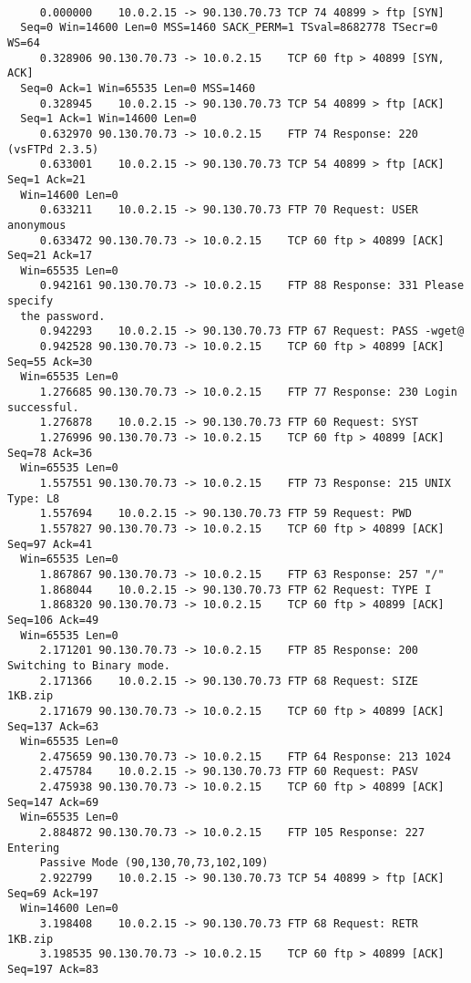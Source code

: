 \documentclass[a4paper]{report} %
\begin{document}
\begin{lstlisting}

     0.000000    10.0.2.15 -> 90.130.70.73 TCP 74 40899 > ftp [SYN] 
  Seq=0 Win=14600 Len=0 MSS=1460 SACK_PERM=1 TSval=8682778 TSecr=0 WS=64
     0.328906 90.130.70.73 -> 10.0.2.15    TCP 60 ftp > 40899 [SYN, ACK] 
  Seq=0 Ack=1 Win=65535 Len=0 MSS=1460
     0.328945    10.0.2.15 -> 90.130.70.73 TCP 54 40899 > ftp [ACK] 
  Seq=1 Ack=1 Win=14600 Len=0
     0.632970 90.130.70.73 -> 10.0.2.15    FTP 74 Response: 220 (vsFTPd 2.3.5)
     0.633001    10.0.2.15 -> 90.130.70.73 TCP 54 40899 > ftp [ACK] Seq=1 Ack=21 
  Win=14600 Len=0
     0.633211    10.0.2.15 -> 90.130.70.73 FTP 70 Request: USER anonymous
     0.633472 90.130.70.73 -> 10.0.2.15    TCP 60 ftp > 40899 [ACK] Seq=21 Ack=17 
  Win=65535 Len=0 
     0.942161 90.130.70.73 -> 10.0.2.15    FTP 88 Response: 331 Please specify 
  the password.
     0.942293    10.0.2.15 -> 90.130.70.73 FTP 67 Request: PASS -wget@
     0.942528 90.130.70.73 -> 10.0.2.15    TCP 60 ftp > 40899 [ACK] Seq=55 Ack=30 
  Win=65535 Len=0
     1.276685 90.130.70.73 -> 10.0.2.15    FTP 77 Response: 230 Login successful.
     1.276878    10.0.2.15 -> 90.130.70.73 FTP 60 Request: SYST
     1.276996 90.130.70.73 -> 10.0.2.15    TCP 60 ftp > 40899 [ACK] Seq=78 Ack=36  
  Win=65535 Len=0
     1.557551 90.130.70.73 -> 10.0.2.15    FTP 73 Response: 215 UNIX Type: L8
     1.557694    10.0.2.15 -> 90.130.70.73 FTP 59 Request: PWD
     1.557827 90.130.70.73 -> 10.0.2.15    TCP 60 ftp > 40899 [ACK] Seq=97 Ack=41 
  Win=65535 Len=0
     1.867867 90.130.70.73 -> 10.0.2.15    FTP 63 Response: 257 "/"
     1.868044    10.0.2.15 -> 90.130.70.73 FTP 62 Request: TYPE I
     1.868320 90.130.70.73 -> 10.0.2.15    TCP 60 ftp > 40899 [ACK] Seq=106 Ack=49 
  Win=65535 Len=0
     2.171201 90.130.70.73 -> 10.0.2.15    FTP 85 Response: 200 Switching to Binary mode.
     2.171366    10.0.2.15 -> 90.130.70.73 FTP 68 Request: SIZE 1KB.zip
     2.171679 90.130.70.73 -> 10.0.2.15    TCP 60 ftp > 40899 [ACK] Seq=137 Ack=63 
  Win=65535 Len=0
     2.475659 90.130.70.73 -> 10.0.2.15    FTP 64 Response: 213 1024
     2.475784    10.0.2.15 -> 90.130.70.73 FTP 60 Request: PASV
     2.475938 90.130.70.73 -> 10.0.2.15    TCP 60 ftp > 40899 [ACK] Seq=147 Ack=69 
  Win=65535 Len=0
     2.884872 90.130.70.73 -> 10.0.2.15    FTP 105 Response: 227 Entering 
     Passive Mode (90,130,70,73,102,109)
     2.922799    10.0.2.15 -> 90.130.70.73 TCP 54 40899 > ftp [ACK] Seq=69 Ack=197 
  Win=14600 Len=0
     3.198408    10.0.2.15 -> 90.130.70.73 FTP 68 Request: RETR 1KB.zip
     3.198535 90.130.70.73 -> 10.0.2.15    TCP 60 ftp > 40899 [ACK] Seq=197 Ack=83 

\end{lstlisting}
\end{document}
